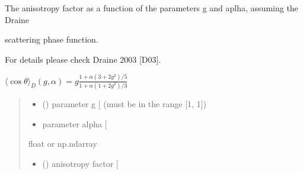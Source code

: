 \documentclass[letterpaper,10pt,english]{sphinxmanual}
\begin{document}

\begin{fulllineitems}
\label{\detokenize{06_anisotropy_factor:skinoptics.anisotropy_factor.costheta_D}}
\pysigstartsignatures
{}
\pysigstopsignatures
\begin{DUlineblock}{0em}
\item[] The anisotropy factor as a function of the parameters g and aplha, assuming the Draine
\item[] scattering phase function.
\item[] For details please check Draine 2003 {[}D03{]}.
\end{DUlineblock}

\sphinxAtStartPar
\(\langle \cos\theta \rangle_{D}(g, \alpha) = g\frac{1 + \alpha(3 + 2g^2)/5}{1 + \alpha(1 + 2g^2)/3}\)
\begin{quote}\begin{description}
\begin{itemize}
\item {} 
\sphinxAtStartPar
{} () \textendash{} parameter g {[}\sphinxhyphen{}{]} (must be in the range {[}\sphinxhyphen{}1, 1{]})

\item {} 
\sphinxAtStartPar
{} \textendash{} parameter alpha {[}\sphinxhyphen{}{]}

\end{itemize}

\sphinxAtStartPar
float or np.ndarray

\sphinxAtStartPar
\begin{itemize}
\item {} 
\sphinxAtStartPar
{} () \textendash{} anisotropy factor {[}\sphinxhyphen{}{]}

\end{itemize}


\end{description}\end{quote}

\end{fulllineitems}
\end{document}
